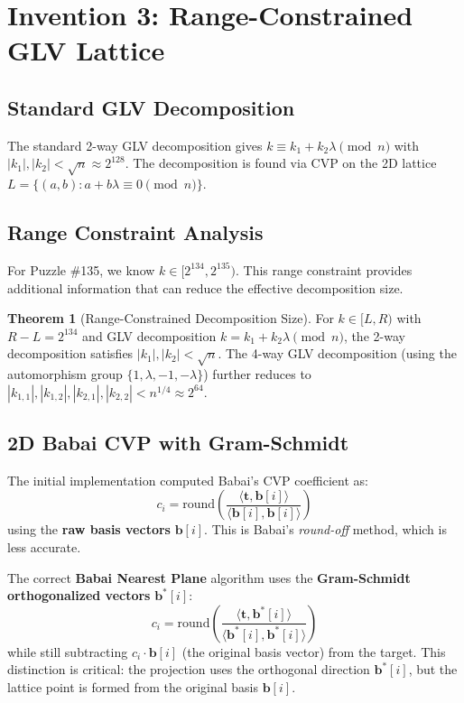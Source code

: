 \documentclass[11pt,a4paper]{article}
\theoremstyle{definition}
\newtheorem{theorem}{Theorem}[section]
\newcommand{\sqn}{\sqrt{n}}
\begin{document}
\section{Invention 3: Range-Constrained GLV Lattice}

\subsection{Standard GLV Decomposition}

The standard 2-way GLV decomposition gives $k \equiv k_1 + k_2\lambda \pmod{n}$ with $|k_1|, |k_2| < \sqn \approx 2^{128}$. The decomposition is found via CVP on the 2D lattice $L = \{(a, b) : a + b\lambda \equiv 0 \pmod{n}\}$.

\subsection{Range Constraint Analysis}

For Puzzle \#135, we know $k \in [2^{134}, 2^{135})$. This range constraint provides additional information that can reduce the effective decomposition size.

\begin{theorem}[Range-Constrained Decomposition Size]
For $k \in [L, R)$ with $R - L = 2^{134}$ and GLV decomposition $k = k_1 + k_2\lambda \pmod{n}$, the 2-way decomposition satisfies $|k_1|, |k_2| < \sqn$. The 4-way GLV decomposition (using the automorphism group $\{1, \lambda, -1, -\lambda\}$) further reduces to $|k_{1,1}|, |k_{1,2}|, |k_{2,1}|, |k_{2,2}| < n^{1/4} \approx 2^{64}$.
\end{theorem}

\subsection{2D Babai CVP with Gram-Schmidt}

\begin{tcolorbox}[colback=red!5, colframe=red!70!black, title={\textbf{CRITICAL BUG FIX: Gram-Schmidt in Babai's Nearest Plane}}]
The initial implementation computed Babai's CVP coefficient as:
$$c_i = \text{round}\left(\frac{\langle \mathbf{t}, \mathbf{b}[i] \rangle}{\langle \mathbf{b}[i], \mathbf{b}[i] \rangle}\right)$$
using the \textbf{raw basis vectors} $\mathbf{b}[i]$. This is Babai's \emph{round-off} method, which is less accurate.

The correct \textbf{Babai Nearest Plane} algorithm uses the \textbf{Gram-Schmidt orthogonalized vectors} $\mathbf{b}^*[i]$:
$$c_i = \text{round}\left(\frac{\langle \mathbf{t}, \mathbf{b}^*[i] \rangle}{\langle \mathbf{b}^*[i], \mathbf{b}^*[i] \rangle}\right)$$
while still subtracting $c_i \cdot \mathbf{b}[i]$ (the original basis vector) from the target. This distinction is critical: the projection uses the orthogonal direction $\mathbf{b}^*[i]$, but the lattice point is formed from the original basis $\mathbf{b}[i]$.
\end{tcolorbox}
\end{document}
